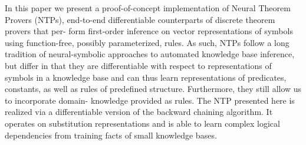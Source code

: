 In this paper we present a proof-of-concept implementation of Neural Theorem Provers (NTPs), end-to-end differentiable counterparts of discrete theorem provers that per- form first-order inference on vector representations of symbols using function-free, possibly parameterized, rules. As such, NTPs follow a long tradition of neural-symbolic approaches to automated knowledge base inference, but differ in that they are differentiable with respect to representations of symbols in a knowledge base and can thus learn representations of predicates, constants, as well as rules of predefined structure. Furthermore, they still allow us to incorporate domain- knowledge provided as rules. The NTP presented here is realized via a differentiable version of the backward chaining algorithm. It operates on substitution representations and is able to learn complex logical dependencies from training facts of small knowledge bases.
